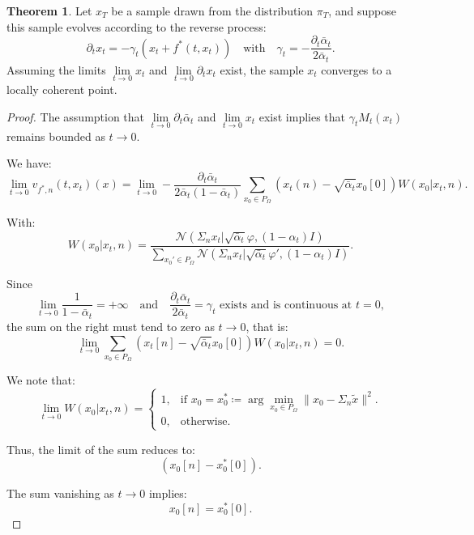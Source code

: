 \documentclass[a4paper,10pt]{article}
\theoremstyle{definition} %
\theoremstyle{definition} %
\theoremstyle{definition} %
\newtheorem{theorem}[definition]{Theorem}
\theoremstyle{definition} %
\newcommand{\0}{\boldsymbol{0}}
\begin{document}
\begin{theorem}
    Let \(x_T\) be a sample drawn from the distribution \(\pi_T\), and suppose this sample evolves according to the reverse process:
    \[
        \partial_t x_t = - \gamma_t \left( x_t + f^*(t,x_t) \right) \quad \text{with} \quad \gamma_t = -\frac{\partial_t \bar{\alpha}_t}{2 \bar \alpha_t}.
    \]
    Assuming the limits \( \lim\limits_{t \to 0} x_t \) and \( \lim\limits_{t \to 0} \partial_t x_t \) exist, the sample \( x_t \) converges to a locally coherent point.
\end{theorem}

\begin{proof}
    The assumption that \( \lim\limits_{t \to 0} \partial_t \bar \alpha_t \) and \( \lim\limits_{t \to 0} x_t \) exist implies that \( \gamma_t M_t(x_t) \) remains bounded as \( t \to 0 \).

    We have:
    \[
        \lim\limits_{t \to 0} v_{f^*,n}(t,x_t) (x) = \lim\limits_{t \to 0} - \frac{\partial_t \bar \alpha_t}{2\bar  \alpha_t (1 - \bar \alpha_t)} \sum_{x_0 \in P_{\Omega}} \left(x_t(n) - \sqrt{\bar{\alpha}_t} x_0[0]\right) W(x_0|x_t,n).
    \]

    With:
    \[
        W(x_0|x_t,n) = \frac{\mathcal{N}(\Sigma_n x_t | \sqrt{\bar{\alpha}_t} \varphi, (1 - \alpha_t)I)}
        {\sum\limits_{x_0' \in P_{\Omega}} \mathcal{N}(\Sigma_n x_t | \sqrt{\bar{\alpha}_t} \varphi', (1 - \alpha_t)I)}.
    \]

    Since 
    \[
        \lim\limits_{t \to 0} \frac{1}{1 - \bar \alpha_t} = +\infty 
        \quad \text{and} \quad 
        \frac{\partial_t \bar \alpha_t}{2 \bar \alpha_t} = \gamma_t \text{ exists and is continuous at } t=0,
    \]
    the sum on the right must tend to zero as \( t \to 0 \), that is:
    \[
        \lim\limits_{t \to 0} \sum_{x_0 \in P_{\Omega}} \left(x_t[n] - \sqrt{\bar{\alpha}_t} x_0[0]\right) W(x_0|x_t,n) = 0.
    \]

    We note that:
    \[
        \lim\limits_{t \to 0} W(x_0|x_t,n) =
        \begin{cases} 
        1, & \text{if } x_0 = x_0^* \coloneqq \arg \min_{x_0 \in P_{\Omega}} \|x_0 - \Sigma_n \tilde{x}\|^2. \\
        0, & \text{otherwise}.
        \end{cases}
    \]

    Thus, the limit of the sum reduces to:
    \[
        (x_0[n] - x_0^*[0]).
    \]

    The sum vanishing as \( t \to 0 \) implies:
    \[
        x_0[n] = x_0^*[0].
    \]
\end{proof}
\end{document}

